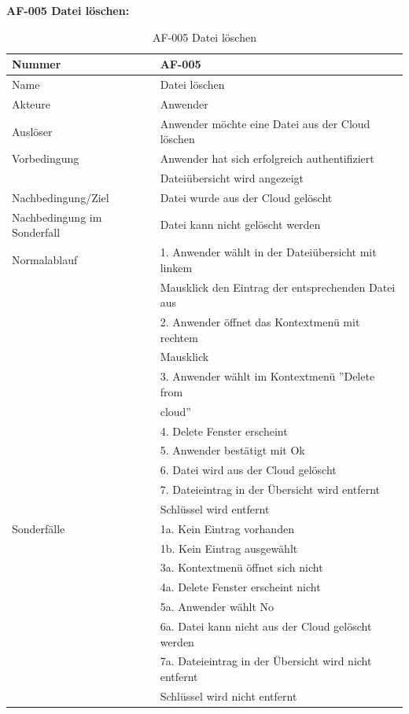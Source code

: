 \documentclass[12pt,a4paper,bibliography=totocnumbered,listof=totocnumbered]{scrartcl}
\begin{document}
\textbf{AF-005 Datei l\"oschen:}
\begin{table}[!h]
	\centering
	\begin{tabular}{|l|l|}
		\hline
		Nummer & AF-005\\
		\hline
		Name & Datei löschen\\
		\hline
		Akteure & Anwender\\
		\hline
		Auslöser & Anwender möchte eine Datei aus der Cloud löschen\\
		\hline
		Vorbedingung & Anwender hat sich erfolgreich authentifiziert \\ & Dateiübersicht wird angezeigt\\
		\hline
		Nachbedingung/Ziel & Datei wurde aus der Cloud gelöscht \\
		\hline
		Nachbedingung im Sonderfall & Datei kann nicht gelöscht werden \\
		\hline
		Normalablauf & 1. Anwender wählt in der Dateiübersicht mit linkem \\&Mausklick den Eintrag der entsprechenden Datei aus \\ & 2. Anwender öffnet das Kontextmenü mit rechtem\\& Mausklick \\ & 3. Anwender wählt im Kontextmenü ''Delete from \\&cloud'' \\ & 4. Delete Fenster erscheint \\ & 5. Anwender bestätigt mit Ok \\  & 6. Datei wird aus der Cloud gelöscht \\ & 7. Dateieintrag in der Übersicht wird entfernt \\& Schlüssel wird entfernt \\
		\hline
		Sonderfälle & 1a. Kein Eintrag vorhanden\\& 1b. Kein Eintrag ausgewählt\\ & 3a. Kontextmenü öffnet sich nicht \\ & 4a. Delete Fenster erscheint nicht \\ & 5a. Anwender wählt No \\ & 6a. Datei kann nicht aus der Cloud gelöscht werden \\ & 7a. Dateieintrag in der Übersicht wird nicht entfernt\\& Schlüssel wird nicht entfernt\\
		\hline
	\end{tabular}
	\caption{AF-005 Datei löschen}
	\label{tab:AF-005 Datei loeschen}
\end{table}
\pagebreak
\end{document}
